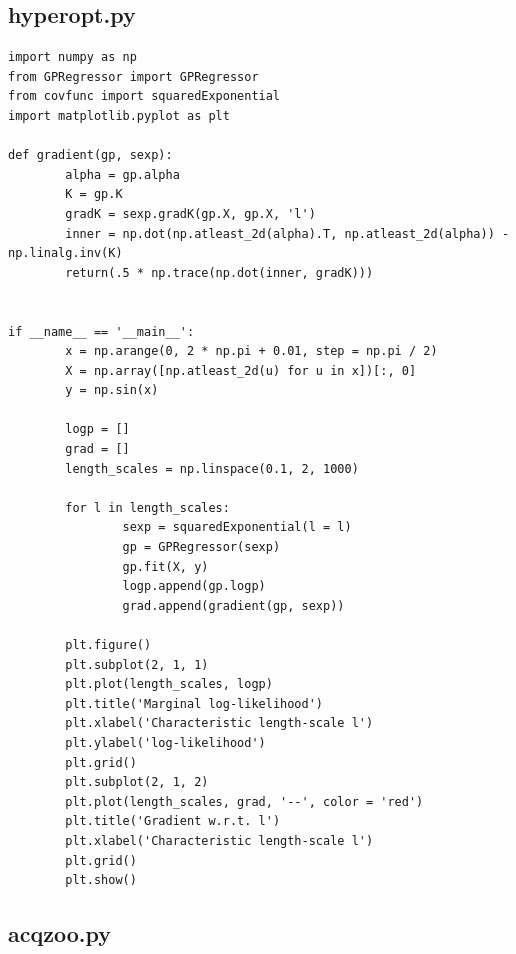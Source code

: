 \documentclass[10pt,a4paper,twoside]{book}
\begin{document}
\subsection*{hyperopt.py}
\label{hyperopt}
\begin{verbatim}
import numpy as np
from GPRegressor import GPRegressor
from covfunc import squaredExponential
import matplotlib.pyplot as plt

def gradient(gp, sexp):
        alpha = gp.alpha
        K = gp.K
        gradK = sexp.gradK(gp.X, gp.X, 'l')
        inner = np.dot(np.atleast_2d(alpha).T, np.atleast_2d(alpha)) - np.linalg.inv(K)
        return(.5 * np.trace(np.dot(inner, gradK)))


if __name__ == '__main__':
        x = np.arange(0, 2 * np.pi + 0.01, step = np.pi / 2)
        X = np.array([np.atleast_2d(u) for u in x])[:, 0]
        y = np.sin(x)

        logp = []
        grad = []
        length_scales = np.linspace(0.1, 2, 1000)

        for l in length_scales:
                sexp = squaredExponential(l = l)
                gp = GPRegressor(sexp)
                gp.fit(X, y)
                logp.append(gp.logp)
                grad.append(gradient(gp, sexp))

        plt.figure()
        plt.subplot(2, 1, 1)
        plt.plot(length_scales, logp)
        plt.title('Marginal log-likelihood')
        plt.xlabel('Characteristic length-scale l')
        plt.ylabel('log-likelihood')
        plt.grid()
        plt.subplot(2, 1, 2)
        plt.plot(length_scales, grad, '--', color = 'red')
        plt.title('Gradient w.r.t. l')
        plt.xlabel('Characteristic length-scale l')
        plt.grid()
        plt.show()
\end{verbatim}

\subsection*{acqzoo.py}
\end{document}
